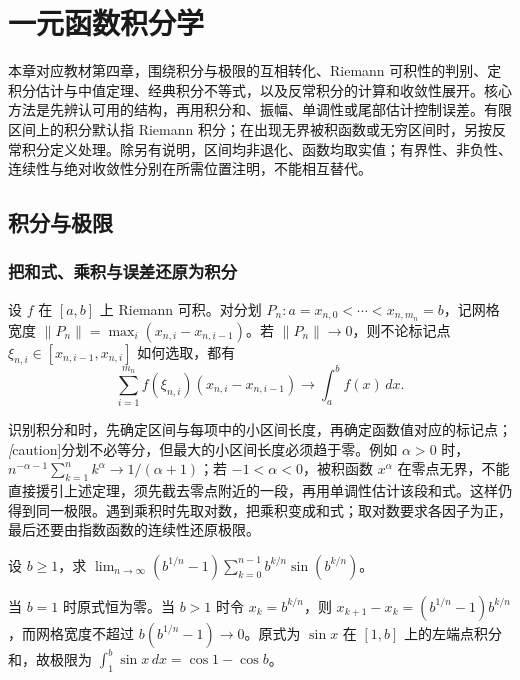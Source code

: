 \setcounter{chapter}{3} %
\chapter{一元函数积分学}
\label{chap:pei-int-integral-calculus}

本章对应教材第四章，围绕积分与极限的互相转化、Riemann 可积性的判别、定积分估计与中值定理、经典积分不等式，以及反常积分的计算和收敛性展开。核心方法是先辨认可用的结构，再用积分和、振幅、单调性或尾部估计控制误差。有限区间上的积分默认指 Riemann 积分；在出现无界被积函数或无穷区间时，另按反常积分定义处理。除另有说明，区间均非退化、函数均取实值；有界性、非负性、连续性与绝对收敛性分别在所需位置注明，不能相互替代。


\section{积分与极限}
\label{sec:pei-int-integral-limits}

\subsection{把和式、乘积与误差还原为积分}
\begin{theorem}
\label{thm:pei-int-riemann-sum}
设 $f$ 在 $[a,b]$ 上 Riemann 可积。对分划 $P_n:a=x_{n,0}<\cdots<x_{n,m_n}=b$，记网格宽度 $\lVert P_n\rVert=\max_i(x_{n,i}-x_{n,i-1})$。若 $\lVert P_n\rVert\to0$，则不论标记点 $\xi_{n,i}\in[x_{n,i-1},x_{n,i}]$ 如何选取，都有
\[
 \sum_{i=1}^{m_n}f(\xi_{n,i})(x_{n,i}-x_{n,i-1})\longrightarrow\int_a^b f(x)\,dx.
\]
\end{theorem}
识别积分和时，先确定区间与每项中的小区间长度，再确定函数值对应的标记点；\emph[caution]{分划不必等分，但最大的小区间长度必须趋于零}。例如 $\alpha>0$ 时，$n^{-\alpha-1}\sum_{k=1}^n k^\alpha\to1/(\alpha+1)$；若 $-1<\alpha<0$，被积函数 $x^\alpha$ 在零点无界，不能直接援引上述定理，须先截去零点附近的一段，再用单调性估计该段和式。这样仍得到同一极限。遇到乘积时先取对数，把乘积变成和式；取对数要求各因子为正，最后还要由指数函数的连续性还原极限。

\begin{example}
\label{ex:pei-int-geometric-partition}
设 $b\ge1$，求 $\displaystyle\lim_{n\to\infty}(b^{1/n}-1)\sum_{k=0}^{n-1}b^{k/n}\sin(b^{k/n})$。
\end{example}
\begin{solve}
当 $b=1$ 时原式恒为零。当 $b>1$ 时令 $x_k=b^{k/n}$，则 $x_{k+1}-x_k=(b^{1/n}-1)b^{k/n}$，而网格宽度不超过 $b(b^{1/n}-1)\to0$。原式为 $\sin x$ 在 $[1,b]$ 上的左端点积分和，故极限为 $\int_1^b\sin x\,dx=\cos1-\cos b$。
\end{solve}

